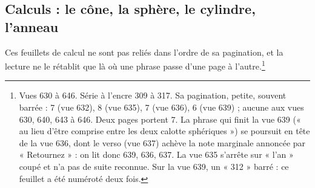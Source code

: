 \documentclass[11pt,a4paper]{article}
\begin{document}
\subsection*{Calculs : le cône, la sphère, le cylindre, l'anneau}

Ces feuillets de calcul ne sont pas reliés dans l'ordre de sa pagination, et
la lecture ne le rétablit que là où une phrase passe d'une page à
l'autre.\footnote{Vues 630 à 646. Série à l'encre 309 à 317. Sa pagination,
petite, souvent barrée : 7 (vue 632), 8 (vue 635), 7 (vue 636), 6 (vue 639) ;
aucune aux vues 630, 640, 643 à 646. Deux pages portent 7. La phrase qui finit
la vue 639 (« au lieu d'être comprise entre les deux calotte sphériques ») se
poursuit en tête de la vue 636, dont le verso (vue 637) achève la note
marginale annoncée par « Retournez » : on lit donc 639, 636, 637. La vue 635
s'arrête sur « l'an » coupé et n'a pas de suite reconnue. Sur la vue 639, un
« 312 » barré : ce feuillet a été numéroté deux fois.}
\end{document}
